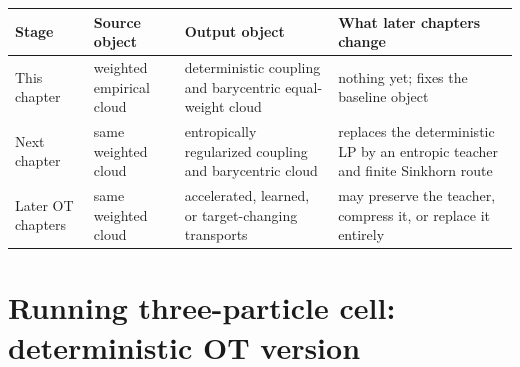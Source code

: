 \begin{center}
\small
\begin{tabular}{p{} p{} p{} p{}}
\toprule
Stage & Source object & Output object & What later chapters change \\
\midrule
This chapter & weighted empirical cloud & deterministic coupling and barycentric equal-weight cloud & nothing yet; fixes the baseline object \\
Next chapter & same weighted cloud & entropically regularized coupling and barycentric cloud & replaces the deterministic LP by an entropic teacher and finite Sinkhorn route \\
Later OT chapters & same weighted cloud & accelerated, learned, or target-changing transports & may preserve the teacher, compress it, or replace it entirely \\
\bottomrule
\end{tabular}
\end{center}

\section{Running three-particle cell: deterministic OT version}
\label{sec:bf-ot-baseline-cell}

